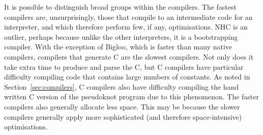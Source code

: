 It is possible to distinguish broad groups within the compilers.  The
fastest compilers are, unsurprisingly, those that compile to an
intermediate code for an interpreter, and which therefore perform few,
if any, optimisations.  NHC is an outlier, perhaps because unlike the
other interpreters, it is a bootstrapping compiler.  With the
exception of Bigloo, which is faster than many native compilers,
compilers that generate C are the slowest compilers.  Not only does it
take extra time to produce and parse the C, but C compilers have
particular difficulty compiling code that contains large numbers of
constants. As noted in Section~\ref{sec:compilers}, C compilers also have
difficulty compiling the hand written C version of the pseudoknot
program due to this phenomenon.  The faster compilers also generally
allocate less space.  This may be because the slower compilers
generally apply more sophisticated (and therefore space-intensive)
optimisations.

